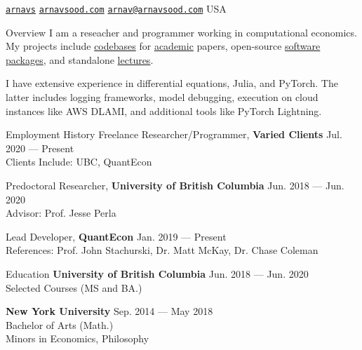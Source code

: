 \documentclass{resume} %
\begin{document}
 \href{https://github.com/arnavs}{\tt arnavs} \vline \hspace{0.5 em} {} \href{https://arnavsood.com}{\tt arnavsood.com} \vline \hspace{0.5 em} {} \href{mailto:arnav@arnavsood.com}{\tt arnav@arnavsood.com} \vline \hspace{0.5 em}  USA 

\begin{rSection}{Overview}
   I am a reseacher and programmer working in computational economics. My projects include \href{https://github.com/jlperla/PerlaTonettiWaugh.jl}{codebases} for \href{https://github.com/jlperla/KnowledgeDiffusionSimulations.jl}{academic} papers, open-source \href{https://github.com/quantecon/expectations.jl}{software} \href{https://github.com/quantecon/instantiatefromurl.jl}{packages}, and standalone \href{https://datascience.quantecon.org/applications/recidivism.html}{lectures}. 
   
   I have extensive experience in differential equations, Julia, and PyTorch. The latter includes logging frameworks, model debugging, execution on cloud instances like AWS DLAMI, and additional tools like PyTorch Lightning.
\end{rSection}

\begin{rSection}{Employment History}
Freelance Researcher/Programmer, {\bf Varied Clients} \hfill {Jul. 2020 --- Present} 
\\ Clients Include: UBC, QuantEcon \smallskip 
    
Predoctoral Researcher, {\bf University of British Columbia} \hfill {Jun. 2018 --- Jun. 2020} 
\\ Advisor: Prof. Jesse Perla \smallskip 

Lead Developer, {\bf QuantEcon} \hfill {Jan. 2019 --- Present}
\\ References: Prof. John Stachurski, Dr. Matt McKay, Dr. Chase Coleman
\end{rSection}

\begin{rSection}{Education}
{\bf University of British Columbia} \hfill {Jun. 2018 --- Jun. 2020} 
\\ Selected Courses (MS and BA.)  %

{\bf New York University} \hfill {Sep. 2014 --- May 2018} 
\\ Bachelor of Arts (Math.) %
\\ Minors in Economics, Philosophy 
\end{rSection}
\end{document}
